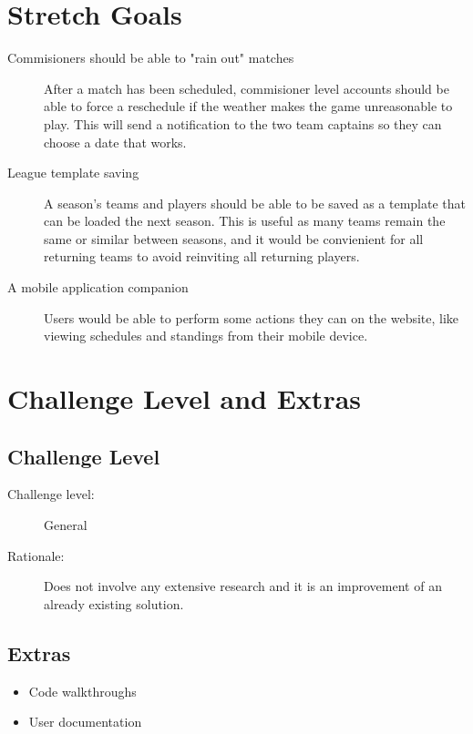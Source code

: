 \documentclass{article}
\begin{document}
\section{Stretch Goals}

\begin{description}
    \item [Commisioners should be able to "rain out" matches] After a match
    has been scheduled, commisioner level accounts should be able to force
    a reschedule if the weather makes the game unreasonable to play. This
    will send a notification to the two team captains so they can
    choose a date that works.
    \item [League template saving] A season's teams and players should be
    able to be saved as a template that can be loaded the next season. This
    is useful as many teams remain the same or similar between seasons, and
    it would be convienient for all returning teams to avoid reinviting all
    returning players.
    \item [A mobile application companion] Users would be able to perform
    some actions they can on the website, like viewing schedules and
    standings from their mobile device.
\end{description}

\section{Challenge Level and Extras}

\subsection{Challenge Level}
\begin{description}
    \item[Challenge level:] General
    \item[Rationale:] Does not involve any extensive research and it is an
    improvement of an already existing solution.
\end{description}

\subsection{Extras}
\begin{itemize}
    \item Code walkthroughs
    \item User documentation
\end{itemize}
\end{document}
